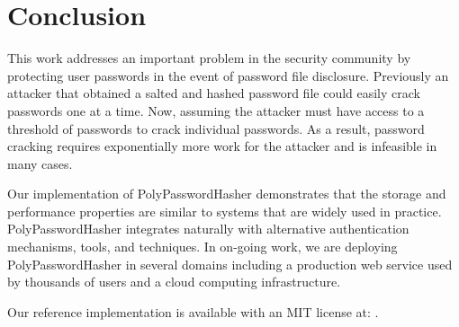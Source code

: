 \section{Conclusion}
\label{sec-conclusion}

This work addresses an important problem in the security community by 
protecting user passwords in the event of password file disclosure.   
Previously an attacker that obtained a salted and hashed password file could 
easily crack passwords one at a time.   Now,
assuming the attacker must have access to a threshold of passwords to 
crack individual passwords.  As a result,
password cracking requires exponentially more work for the attacker and
is infeasible in many cases.

Our implementation of PolyPasswordHasher demonstrates that the storage and
performance properties are similar to systems that are widely used in practice.
PolyPasswordHasher integrates naturally with alternative authentication 
mechanisms, tools, and techniques.
In on-going work, we are deploying PolyPasswordHasher %
in several domains including a production web service used by thousands
of users and a cloud computing infrastructure.   

Our reference implementation is available with an MIT license at:
\showurlx.

%
%
%

